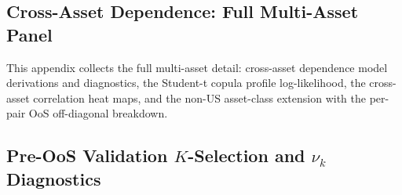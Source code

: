 

\subsection{Cross-Asset Dependence: Full Multi-Asset Panel}
\label{sec:supp_cross_asset}

This appendix collects the full multi-asset detail: cross-asset dependence model derivations and diagnostics, the Student-t copula profile log-likelihood, the cross-asset correlation heat maps, and the non-US asset-class extension with the per-pair OoS off-diagonal breakdown.



\subsection{\texorpdfstring{Pre-OoS Validation $K$-Selection and $\nu_k$ Diagnostics}{Pre-OoS Validation K-Selection and nu\_k Diagnostics}}
\label{sec:supp_misc}


